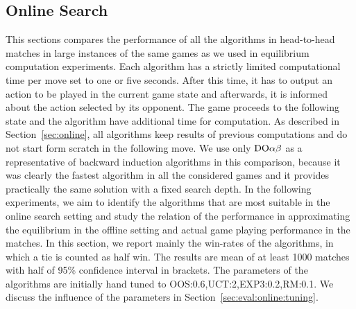 \subsection{Online Search}

This sections compares the performance of all the algorithms in head-to-head matches in large instances of the same games as we used in equilibrium computation experiments. Each algorithm has a strictly limited computational time per move set to one or five seconds. After this time, it has to output an action to be played in the current game state and afterwards, it is informed about the action selected by its opponent. The game proceeds to the following state and the algorithm have additional time for computation. As described in Section~\ref{sec:online}, all algorithms keep results of previous computations and do not start form scratch in the following move. 
We use only $\textrm{DO}\alpha\beta$ as a representative of backward induction algorithms in this comparison, because it was clearly the fastest algorithm in all the considered games and it provides practically the same solution with a fixed search depth.
In the following experiments, we aim to identify the algorithms that are most suitable in the online search setting and study the relation of the performance in approximating the equilibrium in the offline setting and actual game playing performance in the matches. In this section, we report mainly the win-rates of the algorithms, in which a tie is counted as half win.
The results are mean of at least 1000 matches with half of 95\% confidence interval in brackets. The parameters of the algorithms are initially hand tuned to OOS:0.6,UCT:2,EXP3:0.2,RM:0.1. We discuss the influence of the parameters in Section~\ref{sec:eval:online:tuning}.

